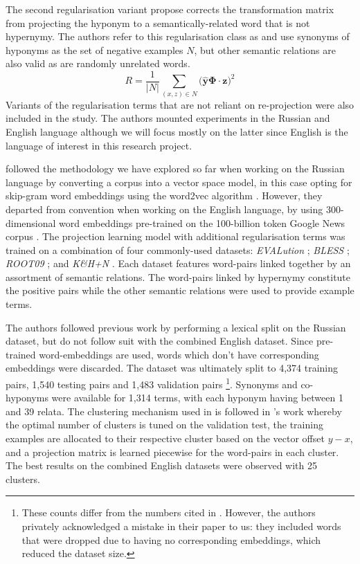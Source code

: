 The second regularisation variant \citeauthor{ustalov2017negative} propose corrects the transformation matrix from projecting the hyponym to a semantically-related word that is not hypernymy.  The authors refer to this regularisation class as  and use synonyms of hyponyms as the set of negative examples $N$, but other semantic relations are also valid as are randomly unrelated words.
\[R = \frac{1}{\vert N \vert} \sum_{(x,z) \in N} \big( \hat{\bm{y}} \bm{\Phi} \cdot \bm{z} \big)^2\]
Variants of the regularisation terms that are not reliant on re-projection were also included in the study.  The authors mounted experiments in the Russian and English language although we will focus mostly on the latter since English is the language of interest in this research project.

\citeauthor{ustalov2017negative} followed the methodology we have explored so far when working on the Russian language by converting a corpus into a vector space model, in this case opting for skip-gram word embeddings using the word2vec algorithm \citep{mikolov2013efficient}.  However, they departed from convention when working on the English language, by using 300-dimensional word embeddings pre-trained on the 100-billion token Google News corpus \citep{mikolov2013efficient}.  The projection learning model with additional regularisation terms was trained on a combination of four commonly-used datasets: \textit{EVALution} \citep{santus2015evalution}; \textit{BLESS} \citep{Baroni2011}; \textit{ROOT09} \citep{santus2016nine}; and \textit{K\&H+N} \citep{necsulescu2015reading}.  Each dataset features word-pairs linked together by an assortment of semantic relations.  The word-pairs linked by hypernymy constitute the positive pairs while the other semantic relations were used to provide  example terms.  

The authors followed previous work \citep{levy2015supervised, shwartz2017siege, santus2016nine, roller2014inclusive} by performing a lexical split on the Russian dataset, but do not follow suit with the combined English dataset.  Since pre-trained word-embeddings are used, words which don’t have corresponding embeddings were discarded.  The dataset was ultimately split to 4,374 training pairs, 1,540 testing pairs and 1,483 validation pairs \footnote{These counts differ from the numbers cited in \citep{ustalov2017negative}.  However, the authors privately acknowledged a mistake in their paper to us: they included words that were dropped due to having no corresponding embeddings, which reduced the dataset size.}.  Synonyms and co-hyponyms were available for 1,314 terms, with each hyponym having between 1 and 39 relata.  The clustering mechanism used in \citep{Fu2014} is followed in \citeauthor{ustalov2017negative}’s work whereby the optimal number of clusters is tuned on the validation test, the training examples are allocated to their respective cluster based on the vector offset $y - x$, and a projection matrix is learned piecewise for the word-pairs in each cluster.  The best results on the combined English datasets were observed with 25 clusters.

